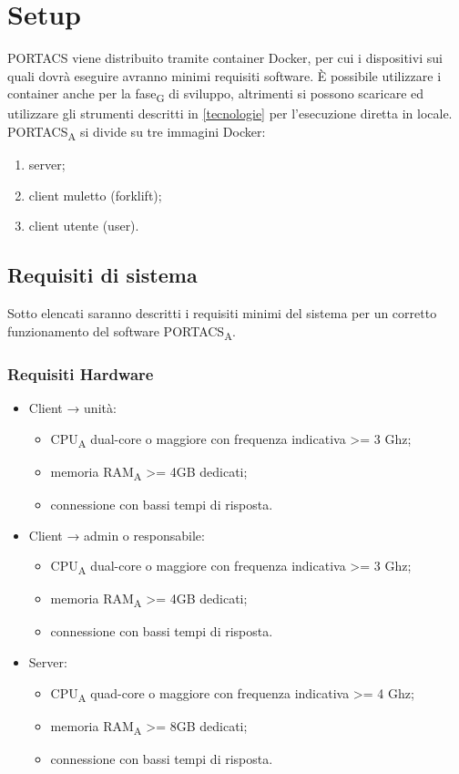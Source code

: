 \section{Setup}
PORTACS viene distribuito tramite container Docker, per cui i dispositivi sui quali dovrà eseguire avranno minimi requisiti software. È possibile utilizzare i container anche per la fase\textsubscript{G} di sviluppo, altrimenti si possono scaricare ed utilizzare gli strumenti descritti in \ref{tecnologie} per l'esecuzione diretta in locale. PORTACS\textsubscript{A} si divide su tre immagini Docker:
\begin{enumerate}
    \item server;
    \item client muletto (forklift);
    \item client utente (user).
\end{enumerate}


\subsection{Requisiti di sistema}
Sotto elencati saranno descritti i requisiti minimi del sistema per un corretto funzionamento del software PORTACS\textsubscript{A}.


\subsubsection{Requisiti Hardware}
\begin{itemize}
	\item Client → unità:
\begin{itemize}
	\item CPU\textsubscript{A} dual-core o maggiore con frequenza indicativa >= 3 Ghz;
	\item memoria RAM\textsubscript{A} >= 4GB dedicati;
	\item connessione con bassi tempi di risposta.
\end{itemize}
	\item Client → admin o responsabile:
\begin{itemize}
	\item CPU\textsubscript{A} dual-core o maggiore con frequenza indicativa >= 3 Ghz;
	\item memoria RAM\textsubscript{A} >= 4GB dedicati;
	\item connessione con bassi tempi di risposta.
\end{itemize}
	\item Server:
\begin{itemize}
	\item CPU\textsubscript{A} quad-core o maggiore con frequenza indicativa >= 4 Ghz;
	\item memoria RAM\textsubscript{A} >= 8GB dedicati;
	\item connessione con bassi tempi di risposta.
\end{itemize}
\end{itemize}

